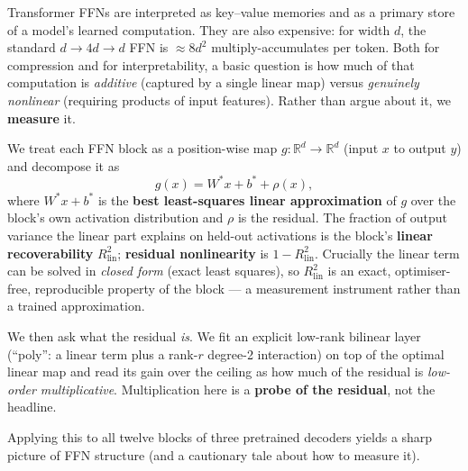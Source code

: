 \documentclass{article}
\newcommand{\Rlin}{R^2_{\mathrm{lin}}}
\begin{document}
Transformer FFNs are interpreted as key--value memories and as a primary store of a model's
learned computation. They are also expensive: for width $d$, the standard $d\!\to\!4d\!\to\!d$
FFN is $\approx 8d^2$ multiply-accumulates per token. Both for compression and for
interpretability, a basic question is how much of that computation is \emph{additive}
(captured by a single linear map) versus \emph{genuinely nonlinear} (requiring products of
input features). Rather than argue about it, we \textbf{measure} it.

We treat each FFN block as a position-wise map $g:\mathbb{R}^d\to\mathbb{R}^d$ (input $x$ to
output $y$) and decompose it as
\begin{equation}
  g(x) = W^{*}x + b^{*} + \rho(x),
\end{equation}
where $W^{*}x + b^{*}$ is the \textbf{best least-squares linear approximation} of $g$ over
the block's own activation distribution and $\rho$ is the residual. The fraction of output
variance the linear part explains on held-out activations is the block's \textbf{linear
recoverability} $\Rlin$; \textbf{residual nonlinearity} is $1-\Rlin$. Crucially the linear
term can be solved in \emph{closed form} (exact least squares), so $\Rlin$ is an exact,
optimiser-free, reproducible property of the block --- a measurement instrument rather than
a trained approximation.

We then ask what the residual \emph{is}. We fit an explicit low-rank bilinear layer
(``poly'': a linear term plus a rank-$r$ degree-2 interaction) on top of the optimal linear
map and read its gain over the ceiling as how much of the residual is \emph{low-order
multiplicative}. Multiplication here is a \textbf{probe of the residual}, not the headline.

Applying this to all twelve blocks of three pretrained decoders yields a sharp picture of
FFN structure (and a cautionary tale about how to measure it).
\end{document}
